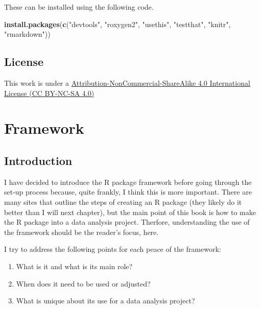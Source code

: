 \documentclass[]{book}
\newenvironment{Shaded}{\begin{snugshade}}{\end{snugshade}}
\newcommand{\KeywordTok}[1]{\textcolor[rgb]{0.13,0.29,0.53}{\textbf{#1}}}
\newcommand{\NormalTok}[1]{#1}
\newcommand{\StringTok}[1]{\textcolor[rgb]{0.31,0.60,0.02}{#1}}
\providecommand{\tightlist}{%
  \setlength{\itemsep}{0pt}\setlength{\parskip}{0pt}}
\begin{document}
These can be installed using the following code.

\begin{Shaded}
\begin{Highlighting}[]
\KeywordTok{install.packages}\NormalTok{(}\KeywordTok{c}\NormalTok{(}\StringTok{"devtools"}\NormalTok{, }\StringTok{"roxygen2"}\NormalTok{, }\StringTok{"usethis"}\NormalTok{, }\StringTok{"testthat"}\NormalTok{,}
                   \StringTok{"knitr"}\NormalTok{, }\StringTok{"rmarkdown"}\NormalTok{))}
\end{Highlighting}
\end{Shaded}

\hypertarget{license}{%
\section*{License}\label{license}}

This work is under a \href{http://creativecommons.org/licenses/by-nc-sa/4.0/}{Attribution-NonCommercial-ShareAlike 4.0 International License (CC BY-NC-SA 4.0)}

\hypertarget{framework}{%
\chapter{Framework}\label{framework}}

\hypertarget{introduction}{%
\section{Introduction}\label{introduction}}

I have decided to introduce the R package framework before going through the set-up process because, quite frankly, I think this is more important. There are many sites that outline the steps of creating an R package (they likely do it better than I will next chapter), but the main point of this book is how to make the R package into a data analysis project. Therfore, understanding the use of the framework should be the reader's focus, here.

I try to address the following points for each peace of the framework:

\begin{enumerate}
\def\labelenumi{\arabic{enumi}.}
\tightlist
\item
  What is it and what is its main role?
\item
  When does it need to be used or adjusted?
\item
  What is unique about its use for a data analysis project?
\end{enumerate}
\end{document}
